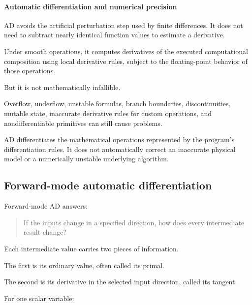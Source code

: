 \paragraph{Automatic differentiation and numerical precision}\label{02-foundations-ii-ch022-automatic-differentiation-and-numerical-precision}

\hypertarget{02-foundations-ii-ch022-automatic-differentiation-and-numerical-precision}{}

AD avoids the artificial perturbation step used by finite differences. It does not need to subtract nearly identical function values to estimate a derivative.

Under smooth operations, it computes derivatives of the executed computational composition using local derivative rules, subject to the floating-point behavior of those operations.

But it is not mathematically infallible.

Overflow, underflow, unstable formulas, branch boundaries, discontinuities, mutable state, inaccurate derivative rules for custom operations, and nondifferentiable primitives can still cause problems.

AD differentiates the mathematical operations represented by the program's differentiation rules. It does not automatically correct an inaccurate physical model or a numerically unstable underlying algorithm.

\subsection{Forward-mode automatic differentiation}\label{02-foundations-ii-ch022-forward-mode-automatic-differentiation}

\hypertarget{02-foundations-ii-ch022-forward-mode-automatic-differentiation}{}

Forward-mode AD answers:

\begin{quote}
If the inputs change in a specified direction, how does every intermediate result change?
\end{quote}

Each intermediate value carries two pieces of information.

The first is its ordinary value, often called its primal.

The second is its derivative in the selected input direction, called its tangent.

For one scalar variable:

